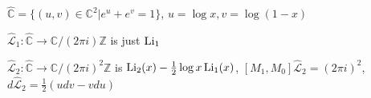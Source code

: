 \documentclass[main]{subfiles}
\begin{document}
$\widehat{\mathbb C}=\{(u,v)\in\mathbb C^2|e^u+e^v=1\}$, $u=\log x,v=\log(1-x)$

$\widehat{\mathcal L}_1:\widehat{\mathbb C}\to\mathbb C/(2\pi i)\mathbb Z$ is just $\operatorname{Li}_1$

$\widehat{\mathcal L}_2:\widehat{\mathbb C}\to\mathbb C/(2\pi i)^2\mathbb Z$ is $\operatorname{Li}_2(x)-\frac{1}{2}\log x\operatorname{Li}_1(x)$, $[M_1,M_0]\widehat{\mathcal L}_2=(2\pi i)^2$, $d\widehat{\mathcal L}_2=\frac{1}{2}(udv-vdu)$
\end{document}
